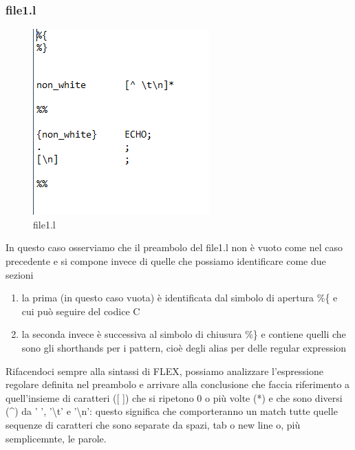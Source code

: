 \documentclass[class=book, crop=false, oneside, 12pt]{standalone}
\begin{document}
\subsubsection{file1.l}

\begin{figure}[h]
    \centering
    \includegraphics[width=.7\textwidth,keepaspectratio]{file1.l.png}
    \caption{file1.l}
    \label{file1.l}
\end{figure}

In questo caso osserviamo che il preambolo del file1.l non è vuoto come nel caso precedente e si compone invece di quelle che possiamo identificare come due sezioni

\begin{enumerate}
    \item la prima (in questo caso vuota) è identificata dal simbolo di apertura \%\{ e cui può seguire del codice C
    \item la seconda invece è successiva al simbolo di chiusura \%\} e contiene quelli che sono gli shorthands per i pattern, cioè degli alias per delle regular expression
\end{enumerate}

Rifacendoci sempre alla sintassi di FLEX, possiamo analizzare l'espressione regolare definita nel preambolo e arrivare alla conclusione che faccia riferimento a quell'insieme di caratteri ([ ]) che si ripetono 0 o più volte (*) e che sono diversi (\^{}) da ' ', '\textbackslash t' e '\textbackslash n': questo significa che comporteranno un match tutte quelle sequenze di caratteri che sono separate da spazi, tab o new line o, più semplicemnte, le parole.
\end{document}

